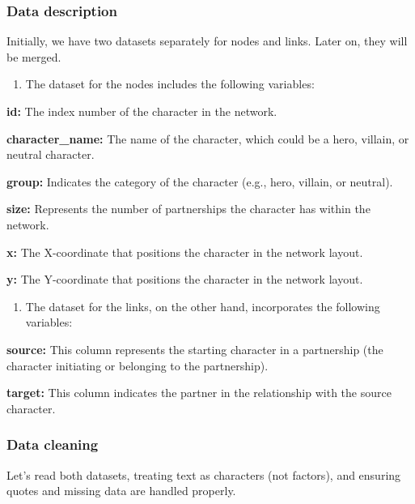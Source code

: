 \documentclass[
  letterpaper,
  DIV=11,
  numbers=noendperiod]{scrartcl}
\providecommand{\tightlist}{%
  \setlength{\itemsep}{0pt}\setlength{\parskip}{0pt}}\usepackage{longtable,booktabs,array}
\begin{document}
\subsubsection{Data description}\label{data-description}

Initially, we have two datasets separately for nodes and links. Later
on, they will be merged.

\begin{enumerate}
\def\labelenumi{\arabic{enumi}.}
\tightlist
\item
  The dataset for the nodes includes the following variables:
\end{enumerate}

\textbf{id:} The index number of the character in the network.

\textbf{character\_name:} The name of the character, which could be a
hero, villain, or neutral character.

\textbf{group:} Indicates the category of the character (e.g., hero,
villain, or neutral).

\textbf{size:} Represents the number of partnerships the character has
within the network.

\textbf{x:} The X-coordinate that positions the character in the network
layout.

\textbf{y:} The Y-coordinate that positions the character in the network
layout.

\begin{enumerate}
\def\labelenumi{\arabic{enumi}.}
\setcounter{enumi}{1}
\tightlist
\item
  The dataset for the links, on the other hand, incorporates the
  following variables:
\end{enumerate}

\textbf{source:} This column represents the starting character in a
partnership (the character initiating or belonging to the partnership).

\textbf{target:} This column indicates the partner in the relationship
with the source character.

\subsubsection{Data cleaning}\label{data-cleaning}

Let's read both datasets, treating text as characters (not factors), and
ensuring quotes and missing data are handled properly.
\end{document}
